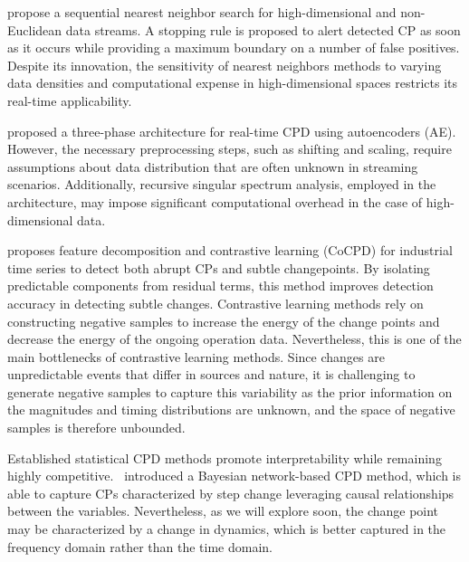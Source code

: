 \citet{Chu2022} propose a sequential nearest neighbor search for high-dimensional and non-Euclidean data streams. A stopping rule is proposed to alert detected CP as soon as it occurs while providing a maximum boundary on a number of false positives. Despite its innovation, the sensitivity of nearest neighbors methods to varying data densities and computational expense in high-dimensional spaces restricts its real-time applicability.

\citet{Gupta2022} proposed a three-phase architecture for real-time CPD using autoencoders (AE). However, the necessary preprocessing steps, such as shifting and scaling, require assumptions about data distribution that are often unknown in streaming scenarios. Additionally, recursive singular spectrum analysis, employed in the architecture, may impose significant computational overhead in the case of high-dimensional data.

\citet{Bao2024} proposes feature decomposition and contrastive learning (CoCPD) for industrial time series to detect both abrupt CPs and subtle changepoints. By isolating predictable components from residual terms, this method improves detection accuracy in detecting subtle changes. Contrastive learning methods rely on constructing negative samples to increase the energy of the change points and decrease the energy of the ongoing operation data. Nevertheless, this is one of the main bottlenecks of contrastive learning methods. Since changes are unpredictable events that differ in sources and nature, it is challenging to generate negative samples to capture this variability as the prior information on the magnitudes and timing distributions are unknown, and the space of negative samples is therefore unbounded.

Established statistical CPD methods promote interpretability while remaining highly competitive.~\citet{Rajaganapathy2022} introduced a Bayesian network-based CPD method, which is able to capture CPs characterized by step change leveraging causal relationships between the variables. Nevertheless, as we will explore soon, the change point may be characterized by a change in dynamics, which is better captured in the frequency domain rather than the time domain.


